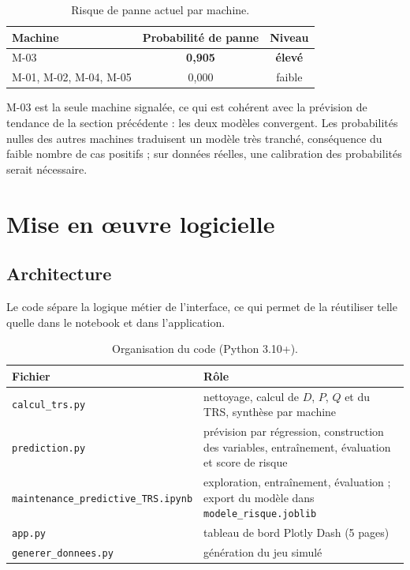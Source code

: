 \documentclass[11pt,a4paper]{article}
\newcommand{\code}[1]{\texttt{#1}}
\begin{document}
\begin{table}[ht]
\centering\small
\caption{Risque de panne actuel par machine.}
\begin{tabular}{@{}lcc@{}}
\toprule
\textbf{Machine} & \textbf{Probabilité de panne} & \textbf{Niveau} \\
\midrule
M-03 & \textbf{0,905} & \textcolor{rouge}{\textbf{élevé}} \\
M-01, M-02, M-04, M-05 & 0,000 & \textcolor{vert}{faible} \\
\bottomrule
\end{tabular}
\end{table}

M-03 est la seule machine signalée, ce qui est cohérent avec la prévision de tendance de la
section précédente : les deux modèles convergent. Les probabilités nulles des autres machines
traduisent un modèle très tranché, conséquence du faible nombre de cas positifs ; sur données
réelles, une calibration des probabilités serait nécessaire.

\section{Mise en œuvre logicielle}

\subsection{Architecture}
Le code sépare la logique métier de l'interface, ce qui permet de la réutiliser telle quelle dans
le notebook et dans l'application.

\begin{table}[ht]
\centering\small
\caption{Organisation du code (Python 3.10+).}
\begin{tabularx}{\textwidth}{@{}l X@{}}
\toprule
\textbf{Fichier} & \textbf{Rôle} \\
\midrule
\code{calcul\_trs.py} & nettoyage, calcul de $D$, $P$, $Q$ et du TRS, synthèse par machine \\
\code{prediction.py} & prévision par régression, construction des variables, entraînement,
                       évaluation et score de risque \\
\code{maintenance\_predictive\_TRS.ipynb} & exploration, entraînement, évaluation ;
                       export du modèle dans \code{modele\_risque.joblib} \\
\code{app.py} & tableau de bord Plotly Dash (5 pages) \\
\code{generer\_donnees.py} & génération du jeu simulé \\
\bottomrule
\end{tabularx}
\end{table}
\end{document}
